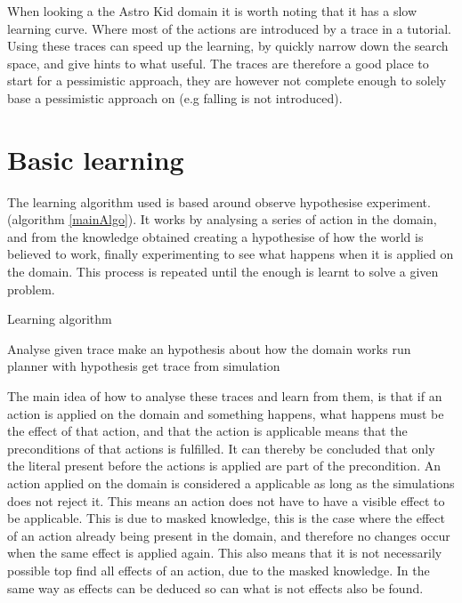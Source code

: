	

	When looking a the Astro Kid domain it is worth noting that it has a slow learning curve. Where most of the actions are introduced by a trace in a tutorial. Using these traces can speed up the learning, by quickly narrow down the search space, and give hints to what useful. The traces are therefore a good place to start for a pessimistic approach, they are however not complete enough to solely base a pessimistic approach on (e.g falling is not introduced).




\section{Basic learning}
	\label{basic}
	The learning algorithm used is based around observe hypothesise experiment. (algorithm \ref{mainAlgo}). It works by analysing a series of action in the domain, and from the knowledge obtained creating a hypothesise of how the world is believed to work, finally experimenting to see what happens when it is applied on the domain. This process is repeated until the enough is learnt to solve a given problem.

	
	\begin{algorithm}
		\caption{Learning algorithm}
		\label{mainAlgo}
		\begin{algorithmic}[1]
			\State Analyse given trace
			\State make an hypothesis about how the domain works
			\State run planner with hypothesis
			\State get trace from simulation
			\EndWhile
			
		\end{algorithmic}
	\end{algorithm}	
	
%	
%	


	The main idea of how to analyse these traces and learn from them, is that if an action is applied on the domain and something happens, what happens must be the effect of that action, and that the action is applicable means that the preconditions of that actions is fulfilled. It can thereby be concluded that only the literal present before the actions is applied are part of the precondition. An action applied on the domain is considered a applicable as long as the simulations does not reject it. This means an action does not have to have a visible effect to be applicable. This is due to masked knowledge, this is the case where the effect of an action already being present in the domain, and therefore no changes occur when the same effect is applied again. This also means that it is not necessarily possible top find all effects of an action, due to the masked knowledge. In the same way as effects can be deduced so can what is not effects also be found.
	
